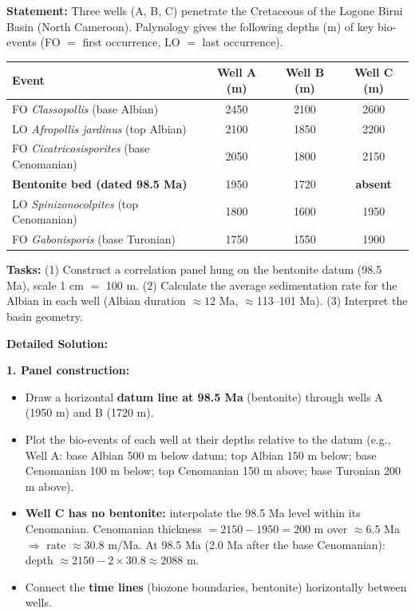\documentclass[11pt]{article}
\begin{document}
\begin{exoresolu}
\textbf{Statement:} Three wells (A, B, C) penetrate the Cretaceous of the Logone Birni Basin (North Cameroon). Palynology gives the following depths (m) of key bio-events (FO $=$ first occurrence, LO $=$ last occurrence).

\begin{center}
\begin{tabular}{|l|c|c|c|}\hline
\rowcolor{popblueL}\textbf{Event} & \textbf{Well A (m)} & \textbf{Well B (m)} & \textbf{Well C (m)} \\ \hline
FO \emph{Classopollis} (base Albian) & 2450 & 2100 & 2600 \\ \hline
LO \emph{Afropollis jardinus} (top Albian) & 2100 & 1850 & 2200 \\ \hline
FO \emph{Cicatricosisporites} (base Cenomanian) & 2050 & 1800 & 2150 \\ \hline
\textbf{Bentonite bed (dated 98.5 Ma)} & 1950 & 1720 & \textbf{absent} \\ \hline
LO \emph{Spinizonocolpites} (top Cenomanian) & 1800 & 1600 & 1950 \\ \hline
FO \emph{Gabonisporis} (base Turonian) & 1750 & 1550 & 1900 \\ \hline
\end{tabular}
\end{center}

\textbf{Tasks:} (1) Construct a correlation panel hung on the bentonite datum (98.5 Ma), scale 1 cm $=$ 100 m. (2) Calculate the average sedimentation rate for the Albian in each well (Albian duration $\approx 12$ Ma, $\approx$113--101 Ma). (3) Interpret the basin geometry.

\tcblower
\textbf{Detailed Solution:}

\textbf{1. Panel construction:}
\begin{itemize}
    \item Draw a horizontal \textbf{datum line at 98.5 Ma} (bentonite) through wells A (1950 m) and B (1720 m).
    \item Plot the bio-events of each well at their depths relative to the datum (e.g., Well A: base Albian 500 m below datum; top Albian 150 m below; base Cenomanian 100 m below; top Cenomanian 150 m above; base Turonian 200 m above).
    \item \textbf{Well C has no bentonite:} interpolate the 98.5 Ma level within its Cenomanian. Cenomanian thickness $= 2150 - 1950 = 200$ m over $\approx 6.5$ Ma $\Rightarrow$ rate $\approx 30.8$ m/Ma. At 98.5 Ma (2.0 Ma after the base Cenomanian): depth $\approx 2150 - 2 \times 30.8 \approx 2088$ m.
    \item Connect the \textbf{time lines} (biozone boundaries, bentonite) horizontally between wells.
\end{itemize}


\end{exoresolu}
\end{document}
